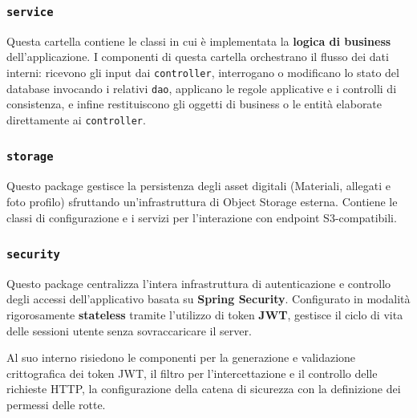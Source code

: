 \subsubsection{\texttt{service}}
Questa cartella contiene le classi in cui è implementata la \textbf{logica di business} dell'applicazione. I componenti di questa cartella orchestrano il flusso dei dati interni: ricevono gli input dai \texttt{controller}, interrogano o modificano lo stato del database invocando i relativi \texttt{dao}, applicano le regole applicative e i controlli di consistenza, e infine restituiscono gli oggetti di business o le entità elaborate direttamente ai \texttt{controller}.

\subsubsection{\texttt{storage}}
Questo package gestisce la persistenza degli asset digitali (Materiali, allegati e foto profilo) sfruttando un'infrastruttura di Object Storage esterna. Contiene le classi di configurazione e i servizi per l'interazione con endpoint S3-compatibili.

\subsubsection{\texttt{security}}
Questo package centralizza l'intera infrastruttura di autenticazione e controllo degli accessi dell'applicativo basata su \textbf{Spring Security}. Configurato in modalità rigorosamente \textbf{stateless} tramite l'utilizzo di token \textbf{JWT}, gestisce il ciclo di vita delle sessioni utente senza sovraccaricare il server. 

Al suo interno risiedono le componenti per la generazione e validazione crittografica dei token JWT, il filtro per l'intercettazione e il controllo delle richieste HTTP, la configurazione della catena di sicurezza con la definizione dei permessi delle rotte.